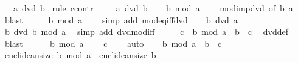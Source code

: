 \begin{isabellebody}
\ \ \ {\isachardoublequoteopen}a\ dvd\ b{\isachardoublequoteclose}\isanewline
%
\isadelimproof
%
\endisadelimproof
%
\isatagproof
{}\isamarkupfalse%
\ {\isacharparenleft}{\kern0pt}rule\ ccontr{\isacharparenright}{\kern0pt}\isanewline
\ \ \isamarkupfalse%
\ {\isachardoublequoteopen}{\isasymnot}\ a\ dvd\ b{\isachardoublequoteclose}\isanewline
\ \ \isamarkupfalse%
\ {\isachardoublequoteopen}b\ mod\ a\ {\isasymnoteq}\ {}{\isachardoublequoteclose}\ \isamarkupfalse%
\ mod{\isacharunderscore}{\kern0pt}{}{\isacharunderscore}{\kern0pt}imp{\isacharunderscore}{\kern0pt}dvd\ {\isacharbrackleft}{\kern0pt}of\ b\ a{\isacharbrackright}{\kern0pt}\ \isamarkupfalse%
\ blast\isanewline
\ \ \isamarkupfalse%
\ \isamarkupfalse%
\ {\isachardoublequoteopen}b\ mod\ a\ {\isasymnoteq}\ {}{\isachardoublequoteclose}\ \isamarkupfalse%
\ {\isacharparenleft}{\kern0pt}simp\ add{\isacharcolon}{\kern0pt}\ mod{\isacharunderscore}{\kern0pt}eq{\isacharunderscore}{\kern0pt}{}{\isacharunderscore}{\kern0pt}iff{\isacharunderscore}{\kern0pt}dvd{\isacharparenright}{\kern0pt}\isanewline
\ \ \isamarkupfalse%
\ {\isacartoucheopen}b\ dvd\ a{\isacartoucheclose}\ \isamarkupfalse%
\ {\isachardoublequoteopen}b\ dvd\ b\ mod\ a{\isachardoublequoteclose}\ \isamarkupfalse%
\ {\isacharparenleft}{\kern0pt}simp\ add{\isacharcolon}{\kern0pt}\ dvd{\isacharunderscore}{\kern0pt}mod{\isacharunderscore}{\kern0pt}iff{\isacharparenright}{\kern0pt}\isanewline
\ \ \isamarkupfalse%
\ \isamarkupfalse%
\ c\ \ {\isachardoublequoteopen}b\ mod\ a\ {\isacharequal}{\kern0pt}\ b\ {\isacharasterisk}{\kern0pt}\ c{\isachardoublequoteclose}\ \isamarkupfalse%
\ dvd{\isacharunderscore}{\kern0pt}def\ \isamarkupfalse%
\ blast\isanewline
\ \ \ \ \isamarkupfalse%
\ {\isacartoucheopen}b\ mod\ a\ {\isasymnoteq}\ {}{\isacartoucheclose}\ \isamarkupfalse%
\ {\isachardoublequoteopen}c\ {\isasymnoteq}\ {}{\isachardoublequoteclose}\ \isamarkupfalse%
\ auto\isanewline
\ \ \isamarkupfalse%
\ {\isacartoucheopen}b\ mod\ a\ {\isacharequal}{\kern0pt}\ b\ {\isacharasterisk}{\kern0pt}\ c{\isacartoucheclose}\ \isamarkupfalse%
\ {\isachardoublequoteopen}euclidean{\isacharunderscore}{\kern0pt}size\ {\isacharparenleft}{\kern0pt}b\ mod\ a{\isacharparenright}{\kern0pt}\ {\isasymge}\ euclidean{\isacharunderscore}{\kern0pt}size\ b{\isachardoublequoteclose}\isanewline

\end{isabellebody}
